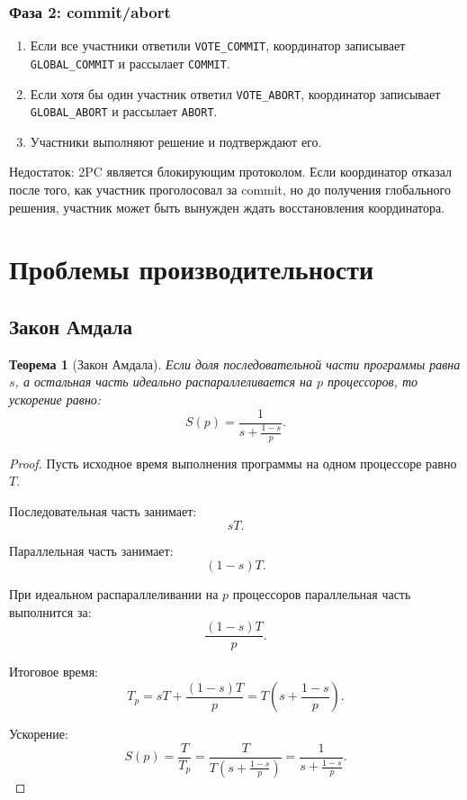 \documentclass[12pt,a4paper]{article}
\newtheorem{theorem}{Теорема}
\begin{document}
\subsubsection{Фаза 2: commit/abort}

\begin{enumerate}
    \item Если все участники ответили \texttt{VOTE\_COMMIT}, координатор записывает \texttt{GLOBAL\_COMMIT} и рассылает \texttt{COMMIT}.
    \item Если хотя бы один участник ответил \texttt{VOTE\_ABORT}, координатор записывает \texttt{GLOBAL\_ABORT} и рассылает \texttt{ABORT}.
    \item Участники выполняют решение и подтверждают его.
\end{enumerate}

Недостаток: 2PC является блокирующим протоколом. Если координатор отказал после того, как участник проголосовал за commit, но до получения глобального решения, участник может быть вынужден ждать восстановления координатора.

\section{Проблемы производительности}

\subsection{Закон Амдала}

\begin{theorem}[Закон Амдала]
Если доля последовательной части программы равна $s$, а остальная часть идеально распараллеливается на $p$ процессоров, то ускорение равно:
\[
S(p) = \frac{1}{s + \frac{1-s}{p}}.
\]
\end{theorem}

\begin{proof}
Пусть исходное время выполнения программы на одном процессоре равно $T$.

Последовательная часть занимает:
\[
sT.
\]

Параллельная часть занимает:
\[
(1-s)T.
\]

При идеальном распараллеливании на $p$ процессоров параллельная часть выполнится за:
\[
\frac{(1-s)T}{p}.
\]

Итоговое время:
\[
T_p = sT + \frac{(1-s)T}{p}
= T\left(s + \frac{1-s}{p}\right).
\]

Ускорение:
\[
S(p) = \frac{T}{T_p}
= \frac{T}{T\left(s + \frac{1-s}{p}\right)}
= \frac{1}{s + \frac{1-s}{p}}.
\]
\end{proof}
\end{document}
